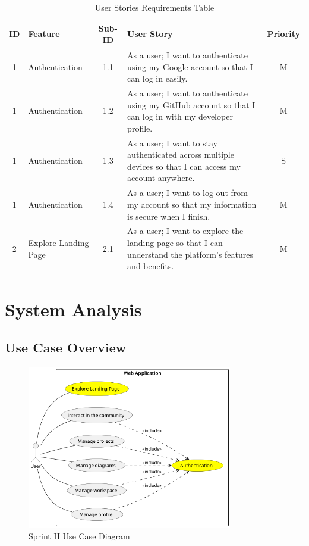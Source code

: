 \begin{table}[H]
    \centering
    \begin{tabular}{|c|l|c|p{8cm}|c|}
    \hline
    \textbf{ID} & \textbf{Feature} & \textbf{Sub-ID} & \textbf{User Story} & \textbf{Priority} \\
    \hline
    1 & Authentication & 1.1 & As a user; I want to authenticate using my Google account so that I can log in easily. & M \\
    \hline
    1  & Authentication & 1.2 & As a user; I want to authenticate using my GitHub account so that I can log in with my developer profile. & M \\
    \hline
    1  & Authentication & 1.3 & As a user; I want to stay authenticated across multiple devices so that I can access my account anywhere. & S \\
    \hline
    1  & Authentication & 1.4 & As a user; I want to log out from my account so that my information is secure when I finish. & M \\
    \hline
    2 & Explore Landing Page & 2.1 & As a user; I want to explore the landing page so that I can understand the platform's features and benefits. & M \\
    \hline
    \end{tabular}
    \caption{User Stories Requirements Table}
    \label{tab:user_stories}
    \end{table}
\section{System Analysis}

\subsection{Use Case Overview}
\begin{figure}[H]
    \centering
    \includegraphics[width=0.8\textwidth]{conception/SprintII/use_case_diagrams/use_case_diagram_of_SprintII.png}
    \caption{Sprint II Use Case Diagram}
    \label{fig:usecase_sprint2}
\end{figure}
\newpage
